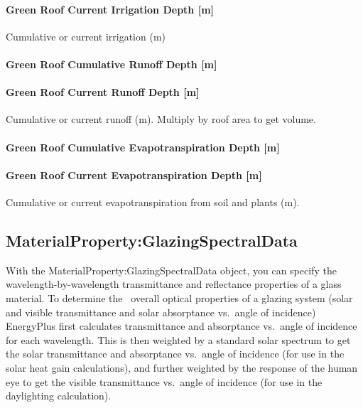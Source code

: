 \paragraph{Green Roof Current Irrigation Depth {[}m{]}}\label{green-roof-current-irrigation-depth-m}

Cumulative or current irrigation (m)

\paragraph{Green Roof Cumulative Runoff Depth {[}m{]}}\label{green-roof-cumulative-runoff-depth-m}

\paragraph{Green Roof Current Runoff Depth {[}m{]}}\label{green-roof-current-runoff-depth-m}

Cumulative or current runoff (m). Multiply by roof area to get volume.

\paragraph{Green Roof Cumulative Evapotranspiration Depth {[}m{]}}\label{green-roof-cumulative-evapotranspiration-depth-m}

\paragraph{Green Roof Current Evapotranspiration Depth {[}m{]}}\label{green-roof-current-evapotranspiration-depth-m}

Cumulative or current evapotranspiration from soil and plants (m).

\subsection{MaterialProperty:GlazingSpectralData}\label{materialpropertyglazingspectraldata}

With the MaterialProperty:GlazingSpectralData object, you can specify the wavelength-by-wavelength transmittance and reflectance properties of a glass material. To determine the~ overall optical properties of a glazing system (solar and visible transmittance and solar absorptance vs.~angle of incidence) EnergyPlus first calculates transmittance and absorptance vs.~angle of incidence for each wavelength. This is then weighted by a standard solar spectrum to get the solar transmittance and absorptance vs.~angle of incidence (for use in the solar heat gain calculations), and further weighted by the response of the human eye to get the visible transmittance vs.~angle of incidence (for use in the daylighting calculation).

